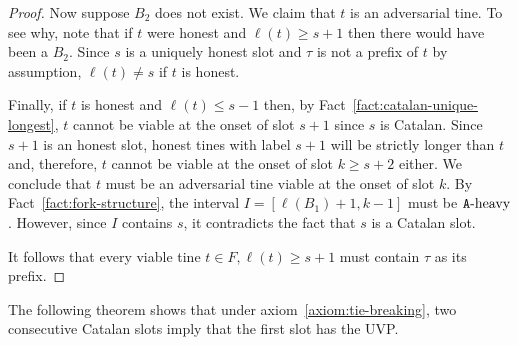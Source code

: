\begin{proof}
    Now suppose $B_2$ does not exist.  We claim that $t$ is an
    adversarial tine.  To see why, note that if $t$ were honest and
    $\ell(t) \geq s + 1$ then there would have been a $B_2$.  Since
    $s$ is a uniquely honest slot and $\tau$ is not a prefix of $t$ by
    assumption, $\ell(t) \neq s$ if $t$ is honest.

    
    Finally, if $t$ is honest and $\ell(t) \leq s - 1$ then, 
    by Fact~\ref{fact:catalan-unique-longest}, 
    $t$ cannot be viable at the onset of slot $s + 1$ 
    since $s$ is Catalan. 
    Since $s + 1$ is an honest slot, 
    honest tines with label $s + 1$ will be strictly longer than $t$ 
    and, therefore, 
    $t$ cannot be viable at the onset of slot $k \geq s + 2$ either. 
    We conclude that $t$ must be an adversarial tine viable at the onset of slot $k$. 
    By Fact~\ref{fact:fork-structure},       
    the interval $I = [\ell(B_1) + 1, k - 1]$ must be $\mathtt{A}\text{-heavy}$. 
    However, since $I$ contains $s$, it contradicts the fact that $s$ is a Catalan slot. 

    It follows that every viable tine 
    $t \in F, \ell(t) \geq s + 1$ must contain $\tau$ as its prefix. 
  \end{proof}




The following theorem shows that under axiom~\ref{axiom:tie-breaking}, 
two consecutive Catalan slots 
imply that the first slot has the UVP.

